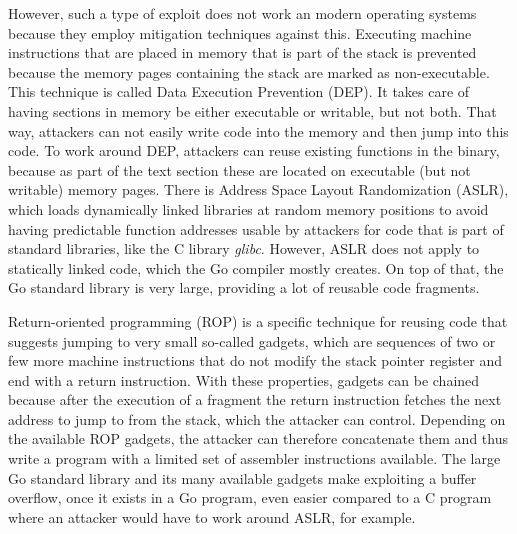 However, such a type of exploit does not work an modern operating systems because they employ mitigation techniques
against this.
Executing machine instructions that are placed in memory that is part of the stack is prevented because the memory pages
containing the stack are marked as non-executable.
This technique is called Data Execution Prevention (\acrshort{DEP}).
It takes care of having sections in memory be either executable or writable, but not both.
That way, attackers can not easily write code into the memory and then jump into this code.
To work around \acrshort{DEP}, attackers can reuse existing functions in the binary, because as part of the text section
these are located on executable (but not writable) memory pages.
There is Address Space Layout Randomization (\acrshort{ASLR}), which loads dynamically linked libraries at random memory
positions to avoid having predictable function addresses usable by attackers for code that is part of standard
libraries, like the C library \textit{glibc}.
However, \acrshort{ASLR} does not apply to statically linked code, which the Go compiler mostly creates.
On top of that, the Go standard library is very large, providing a lot of reusable code fragments.

Return-oriented programming (\acrshort{ROP}) is a specific technique for reusing code that suggests jumping to very
small so-called gadgets, which are sequences of two or few more machine instructions that do not modify the stack
pointer register and end with a return instruction.
With these properties, gadgets can be chained because after the execution of a fragment the return instruction fetches
the next address to jump to from the stack, which the attacker can control.
Depending on the available \acrshort{ROP} gadgets, the attacker can therefore concatenate them and thus write a program
with a limited set of assembler instructions available.
The large Go standard library and its many available gadgets make exploiting a buffer overflow, once it exists in a Go
program, even easier compared to a C program where an attacker would have to work around \acrshort{ASLR}, for example.

